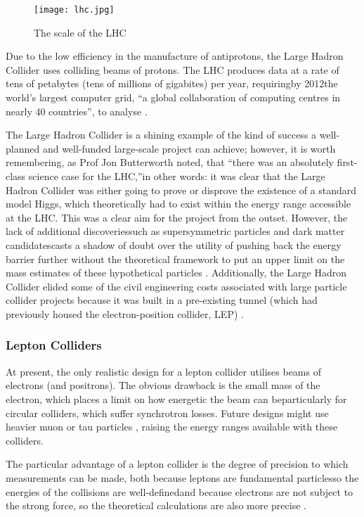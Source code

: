 \begin{figure}
\centering
\texttt{[image: lhc.jpg]}
\caption{The scale of the LHC \cite{ATLAS:Gallery:Online}}
\end{figure}

Due to the low efficiency in the manufacture of antiprotons, the Large Hadron Collider uses colliding beams of protons. The LHC produces data at a rate of tens of petabytes (tens of millions of gigabites) per year, requiring\textemdash by 2012\textemdash the world's largest computer grid, ``a global collaboration of computing centres in nearly 40 countries'', to analyse \cite{LHC:ComputingGrid:Online}.

The Large Hadron Collider is a shining example of the kind of success a well-planned and well-funded large-scale project can achieve; however, it is worth remembering, as Prof Jon Butterworth noted, that ``there was an absolutely first-class science case for the LHC,''\textemdash in other words: it was clear that the Large Hadron Collider was either going to prove or disprove the existence of a standard model Higgs, which theoretically had to exist within the energy range accessible at the LHC. This was a clear aim for the project from the outset. However, the lack of additional discoveries\textemdash such as supersymmetric particles and dark matter candidates\textemdash casts a shadow of doubt over the utility of pushing back the energy barrier further without the theoretical framework to put an upper limit on the mass estimates of these hypothetical particles \cite{Butterworth:Interview}. Additionally, the Large Hadron Collider elided some of the civil engineering costs associated with large particle collider projects because it was built in a pre-existing tunnel (which had previously housed the electron-position collider, LEP) \cite{CERN:LEP:Online}.

\subsubsection{Lepton Colliders}
At present, the only realistic design for a lepton collider utilises beams of electrons (and positrons). The obvious drawback is the small mass of the electron, which places a limit on how energetic the beam can be\textemdash particularly for circular colliders, which suffer synchrotron losses. Future designs might use heavier muon or tau particles \cite{Fermi:Muon:Online}, raising the energy ranges available with these colliders.

The particular advantage of a lepton collider is the degree of precision to which measurements can be made, both because leptons are fundamental particles\textemdash so the energies of the collisions are well-defined\textemdash and because electrons are not subject to the strong force, so the theoretical calculations are also more precise \cite{Thorne:Interview}.

